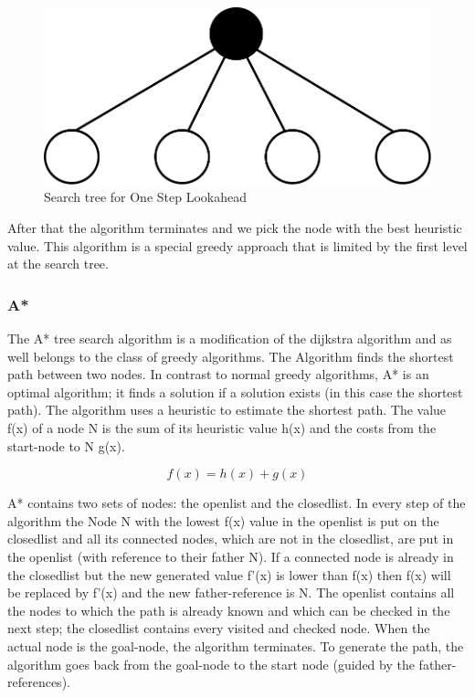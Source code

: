 \begin{figure}
\centering
\includegraphics[scale=0.3]{images/onestep_lookahead.pdf}
\caption{Search tree for One Step Lookahead}
\label{fig:onestep}
\end{figure}


After that the algorithm terminates and we pick the node with the best heuristic value. This algorithm is a special greedy approach that
is limited by the first level at the search tree.

\subsubsection{A*}

The A* tree search algorithm is a modification of the dijkstra algorithm and as well belongs to the class of greedy algorithms. The Algorithm finds the shortest path between two nodes. In contrast to normal greedy algorithms, A* is an optimal algorithm; it finds a solution if a solution exists (in this case the shortest path). The algorithm uses a heuristic to estimate the shortest path. The value f(x) of a node N is the sum of its heuristic value h(x) and the costs from the start-node to N g(x).

\begin{equation}
f(x)=h(x)+g(x)
\end{equation}

A* contains two sets of nodes: the openlist and the closedlist. In every step of the algorithm the Node N with the lowest f(x) value in the openlist is put on the closedlist and all its connected nodes, which are not in the closedlist, are put in the openlist (with reference to their father N). If a connected node is already in the closedlist but the new generated value f'(x) is lower than f(x) then f(x) will be replaced by f'(x) and the new father-reference is N. The openlist contains all the nodes to which the path is already known and which can be checked in the next step; the closedlist contains every visited and checked node. When the actual node is the goal-node, the algorithm terminates. To generate the path, the algorithm goes back from the goal-node to the start node (guided by the father-references). 


